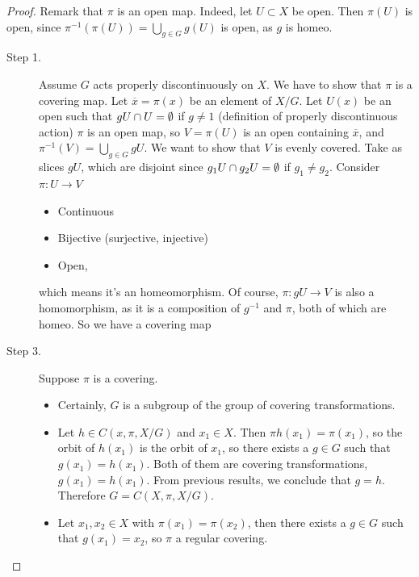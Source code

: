 \begin{proof}
    Remark that $\pi$ is an open map.
    Indeed, let $U \subset X$ be open.
    Then $\pi(U)$ is open, since $\pi^{-1}(\pi(U)) = \bigcup_{g \in G} g(U)$ is open, as $g$ is homeo.

    \begin{description}
        \item[Step 1.]
            Assume $G$ acts properly discontinuously on $X$.
            We have to show that $\pi$ is a covering map.
            Let $\overline{x} = \pi(x)$ be an element of $X / G$.
            Let $U(x)$ be an open such that $gU \cap U = \emptyset$ if $g \neq 1$ (definition of properly discontinuous action)
            $\pi$ is an open map, so  $V = \pi(U)$ is an open containing  $\overline{x}$, and $\pi^{-1}(V) = \bigcup_{g \in G} gU$.
            We want to show that $V$ is evenly covered.
            Take as slices $gU$, which are disjoint since $g_1 U \cap  g_2 U = \emptyset$ if $g_1 \neq g_2$.
            Consider $\pi : U \to V$
            \begin{itemize}
                \item Continuous
                \item Bijective (surjective, injective)
                \item Open,
            \end{itemize}
            which means it's an homeomorphism.
            Of course, $\pi: gU \to  V$ is also a homomorphism, as it is a composition of $g^{-1}$ and $\pi$, both of which are homeo. So we have a covering map
        \item[Step 3.]
            Suppose $\pi$ is a covering.
            \begin{itemize}
                \item Certainly, $G$ is a subgroup of the group of covering transformations.
                \item Let $h \in C( x, \pi, X /G)$ and $x_1 \in X$.
                    Then $\pi h(x_1) = \pi(x_1)$, so the orbit of $h(x_1)$ is the orbit of $x_1$, so there exists a $g \in G$ such that $g(x_1) = h(x_1)$.
                    Both of them are covering transformations, $g(x_1) = h(x_1)$.
                    From previous results, we conclude that $g = h$.
                    Therefore $G = C(X, \pi, X / G)$.
                \item Let $x_1, x_2 \in X$ with $\pi(x_1) = \pi(x_2)$, then there exists a $g \in G$ such that $g(x_1) = x_2$, so $\pi$ a regular covering.
            \end{itemize}



\end{description}
\end{proof}
